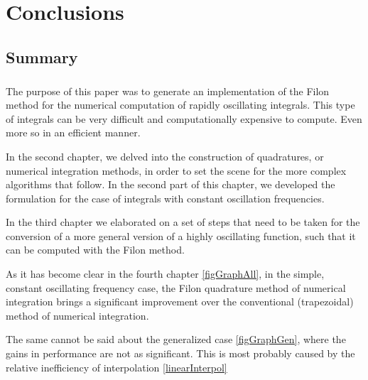 \chapter{Conclusions}

\section{Summary}

\paragraph{} 
The purpose of this paper was to generate an implementation of the Filon method for the numerical computation of rapidly oscillating integrals. This type of integrals can be very difficult and computationally expensive to compute. Even more so in an efficient manner.\par

\vspace{0.1in}

 In the second chapter, we delved into the construction of quadratures, or numerical integration methods, in order to set the scene for the more complex algorithms that follow. In the second part of this chapter, we developed the formulation for the case of integrals with constant oscillation frequencies.\par
 

\vspace{0.1in}

In the third chapter we elaborated on a set of steps that need to be taken for the conversion of a more general version of a highly oscillating function, such that it can be computed with the Filon method.\par

\vspace{0.1in}

As it has become clear in the fourth chapter \ref{figGraphAll}, in the simple, constant oscillating frequency case, the Filon quadrature method of numerical integration brings a significant improvement over the conventional (trapezoidal) method of numerical integration.\par

\vspace{0.1in}

The same cannot be said about the generalized case \ref{figGraphGen}, where the gains in performance are not as significant. This is most probably caused by the relative inefficiency
of interpolation \eqref{linearInterpol}

